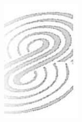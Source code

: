 \documentclass[10pt]{article}
\begin{document}
\begin{center}
\includegraphics[max width=\textwidth]{2024_07_09_002a177993bd97d1d6d7g-016}
\end{center}
\end{document}
